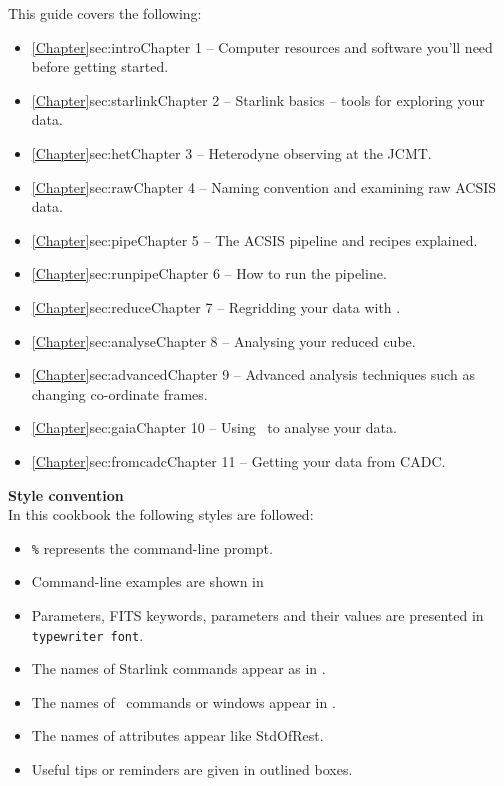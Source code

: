 \documentclass[11pt,oneside,chapters]{starlink}
\providecommand{\att}[1]{\textsf{#1}}
\begin{document}
This guide covers the following:
\begin{itemize}
\itemsep0em
\item \cref{Chapter}{sec:intro}{Chapter 1} -- Computer resources and software you'll need before getting started.
\item \cref{Chapter}{sec:starlink}{Chapter 2} -- Starlink basics -- tools for exploring your data.
\item \cref{Chapter}{sec:het}{Chapter 3} -- Heterodyne observing at the JCMT.
\item \cref{Chapter}{sec:raw}{Chapter 4} -- Naming convention and examining raw ACSIS data.
\item \cref{Chapter}{sec:pipe}{Chapter 5} -- The ACSIS pipeline and recipes explained.
\item \cref{Chapter}{sec:runpipe}{Chapter 6} -- How to run the pipeline.
\item \cref{Chapter}{sec:reduce}{Chapter 7} -- Regridding your data with \makecube.
\item \cref{Chapter}{sec:analyse}{Chapter 8} -- Analysing your reduced cube.
\item \cref{Chapter}{sec:advanced}{Chapter 9} -- Advanced analysis techniques such as changing co-ordinate frames.
\item \cref{Chapter}{sec:gaia}{Chapter 10} -- Using \gaia\ to analyse your data.
\item \cref{Chapter}{sec:fromcadc}{Chapter 11} -- Getting your data from CADC.
\end{itemize}

\textbf{Style convention}\\
In this cookbook the following styles are followed:
\begin{itemize}[noitemsep,nolistsep]
\item \texttt{\%} represents the command-line prompt.
\item Command-line examples are shown in \texttt{\color{MidnightBlue}{navy typewriter font.}}
\item Parameters, FITS keywords, parameters and their values are presented in \texttt{typewriter font}.
\item The names of Starlink commands appear as in .
\item The names of \gaia\ commands or windows appear in .
\item The names of attributes appear like \att{StdOfRest}.
\item Useful tips or reminders are given in outlined boxes.
\end{itemize}
\end{document}
